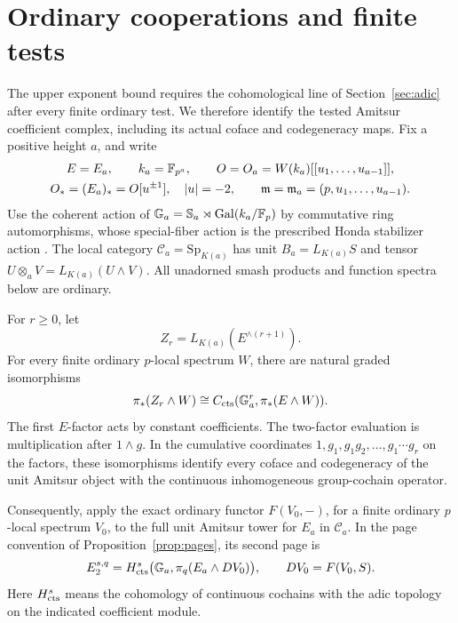 \section{Ordinary cooperations and finite tests}\label{sec:cooperations}

The upper exponent bound requires the cohomological line of
Section~\ref{sec:adic} after every finite ordinary test.
We therefore identify the tested Amitsur coefficient complex, including
its actual coface and codegeneracy maps.
Fix a positive height $a$, and write
\[
 \begin{gathered}
 E=E_a,\qquad k_a=\mathbb F_{p^a},\qquad
 O=O_a=W(k_a)[[u_1,\ldots,u_{a-1}]],\\
 O_*=(E_a)_*=O[u^{\pm1}],\quad |u|=-2,\qquad
 \mathfrak m=\mathfrak m_a=(p,u_1,\ldots,u_{a-1}).
 \end{gathered}
\]
Use the coherent action of $\mathbb G_a=\mathbb S_a\rtimes\operatorname{Gal}(k_a/\mathbb F_p)$ by
commutative ring automorphisms, whose special-fiber action is the
prescribed Honda stabilizer action
\cite[Section~7, Proposition~7.3, Equation~(7.3), and
Corollaries~7.6--7.7]{gh2004}.
The local category $\mathcal C_a=\mathrm{Sp}_{K(a)}$ has unit
$B_a=L_{K(a)}S$ and tensor
$U\otimes_a V=L_{K(a)}(U\wedge V)$.
All unadorned smash products and function spectra below are ordinary.

\begin{proposition}\label{wup:cochains}
For \(r\geq0\), let
\[
 Z_r=L_{K(a)}(E^{\wedge(r+1)}).
\]
For every finite ordinary \(p\)-local spectrum \(W\), there are
natural graded isomorphisms
\begin{equation}\label{wup:tested-functions}
 \pi_*(Z_r\wedge W)
 \cong C_{\operatorname{cts}}(\mathbb G_a^r,\pi_*(E\wedge W)).
\end{equation}
The first \(E\)-factor acts by constant coefficients.
The two-factor evaluation is multiplication after \(1\wedge g\).
In the cumulative coordinates \(1,g_1,g_1g_2,\ldots,g_1\cdots g_r\)
on the factors, these isomorphisms identify every coface and
codegeneracy of the unit Amitsur object with the continuous
inhomogeneous group-cochain operator.

Consequently, apply the exact ordinary functor \(F(V_0,-)\), for a
finite ordinary \(p\)-local spectrum \(V_0\), to the full unit
Amitsur tower for \(E_a\) in \(\mathcal C_a\). In the page convention
of Proposition~\ref{prop:pages}, its second page is
\begin{equation}\label{wup:cochain-page}
 E_2^{s,q}
 =H^s_{\operatorname{cts}}\bigl(\mathbb G_a,\pi_q(E_a\wedge D V_0)\bigr),
 \qquad D V_0=F(V_0,S).
\end{equation}
Here \(H^s_{\operatorname{cts}}\) means the cohomology of continuous cochains with
the adic topology on the indicated coefficient module.
\end{proposition}

